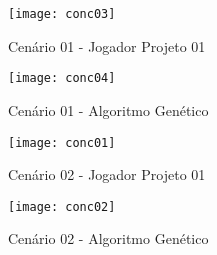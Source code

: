 \documentclass[12pt, a4paper, english, brazil]{abntex2}
\begin{document}
\begin{figure}[!ht]
\centering
\texttt{[image: conc03]}
\caption{Cenário 01 - Jogador Projeto 01}
\label{FigCenario01}
\end{figure}


\begin{figure}[!ht]
\centering
\texttt{[image: conc04]}
\caption{Cenário 01 - Algoritmo Genético}
\label{FigCenario02}
\end{figure}

\begin{figure}[!ht]
\centering
\texttt{[image: conc01]}
\caption{Cenário 02 - Jogador Projeto 01}
\label{FigCenario03}
\end{figure}

\begin{figure}[!ht]
\centering
\texttt{[image: conc02]}
\caption{Cenário 02 - Algoritmo Genético}
\label{FigCenario04}
\end{figure}



\end{document}
